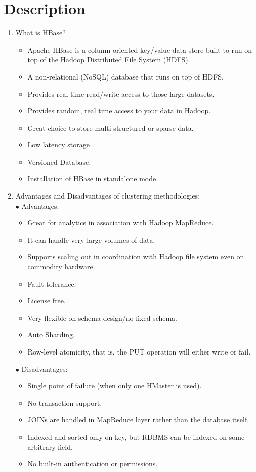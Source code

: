 \documentclass[a4paper,10pt]{article}
\begin{document}
\section{Description}
\begin{enumerate}
	\item What is HBase?
	\begin{itemize}
		\item Apache HBase is a column-oriented key/value data store built to run on top of the Hadoop Distributed
		File System (HDFS).
		\item A non-relational (NoSQL) database that runs on top of HDFS.
		\item Provides real-time read/write access to those large datasets.
		\item Provides random, real time access to your data in Hadoop.
		\item Great choice to store multi-structured or sparse data. 
		\item Low latency storage .
		\item Versioned Database.
		\item Installation of HBase in standalone mode.
		
	\end{itemize}
	\item Advantages and Disadvantages of clustering methodologies: 
	\\
	$\bullet$ Advantages:
	\begin{itemize}
		\item Great for analytics in association with Hadoop MapReduce.
		\item It can handle very large volumes of data.
		\item Supports scaling out in coordination with Hadoop file system even on commodity hardware.
		\item Fault tolerance.
		\item License free.
		\item Very flexible on schema design/no fixed schema.
		\item Auto Sharding.
		\item Row-level atomicity, that is, the PUT operation will either write or fail.
	\end{itemize}
	$\bullet$ Disadvantages:
	\begin{itemize}
		\item Single point of failure (when only one HMaster is used).
		\item No transaction support.
		\item JOINs are handled in MapReduce layer rather than the database itself.
		\item Indexed and sorted only on key, but RDBMS can be indexed on some arbitrary field.
		\item No built-in authentication or permissions.
	\end{itemize}
\end{enumerate}
\end{document}
